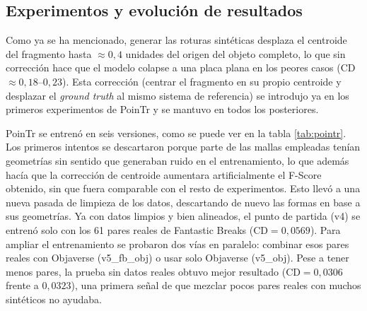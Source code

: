 \documentclass[10pt,a4paper]{report}
\begin{document}
\subsection{Experimentos y evolución de resultados}
\label{subsec:pointr_exp}

Como ya se ha mencionado, generar las roturas sintéticas desplaza el centroide del fragmento hasta $\approx0{,}4$ unidades del origen del objeto completo, lo que sin
corrección hace que el modelo colapse a una placa plana en los peores casos (CD~$\approx 0{,}18$--$0{,}23$). Esta corrección (centrar el fragmento en su propio
centroide y desplazar el \textit{ground truth} al mismo sistema de referencia) se introdujo ya en los primeros experimentos de PoinTr y se mantuvo en todos los posteriores.

PoinTr se entrenó en seis versiones, como se puede ver en la tabla \ref{tab:pointr}. Los primeros intentos se descartaron porque parte de las mallas empleadas tenían geometrías sin
sentido que generaban ruido en el entrenamiento, lo que además hacía que la corrección
de centroide aumentara artificialmente el F-Score obtenido, sin que
fuera comparable con el resto de experimentos. Esto llevó a una nueva pasada de
limpieza de los datos, descartando de nuevo las formas en base a sus geometrías. Ya con datos limpios y bien alineados, el punto de
partida (v4) se entrenó solo con los 61 pares reales de Fantastic Breaks
(CD$=0{,}0569$).
Para ampliar el entrenamiento se probaron dos vías en paralelo: combinar esos pares
reales con Objaverse (v5\_fb\_obj) o usar solo Objaverse (v5\_obj). Pese a tener menos pares, la prueba sin datos reales obtuvo mejor resultado
(CD$=0{,}0306$ frente a $0{,}0323$), una primera señal de que mezclar pocos pares
reales con muchos sintéticos no ayudaba.
\end{document}
